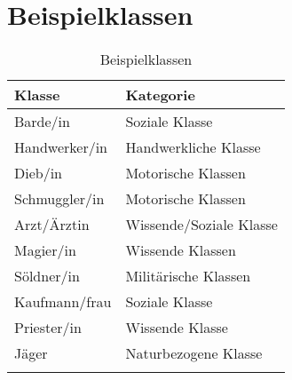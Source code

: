 \section{Beispielklassen}
\begin{longtable}{|l|l|}
\hline
\textbf{Klasse} & \textbf{Kategorie} \\ \hline

Barde/in & Soziale Klasse \\ \hline
Handwerker/in & Handwerkliche Klasse \\ \hline
Dieb/in & Motorische Klassen \\ \hline
Schmuggler/in & Motorische Klassen \\ \hline
Arzt/Ärztin & Wissende/Soziale Klasse \\ \hline
Magier/in & Wissende Klassen \\ \hline
Söldner/in & Militärische Klassen \\ \hline
Kaufmann/frau & Soziale Klasse \\ \hline
Priester/in & Wissende Klasse \\ \hline
Jäger & Naturbezogene Klasse \\ \hline

\caption{Beispielklassen}
\label{tab:Beispielklassen}
\end{longtable}
